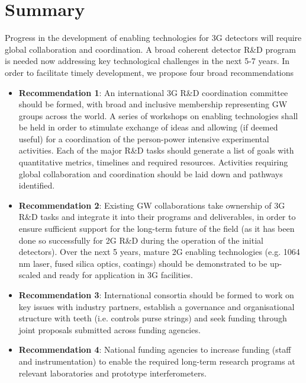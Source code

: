 \chapter{Summary}
\label{sec:Summary}
\vspace{1cm}
Progress in the development of enabling technologies for 3G detectors will require global collaboration and coordination. A broad coherent detector R\&D program is needed now addressing key technological challenges in the next 5-7 years. In order to facilitate timely development, we propose four broad recommendations

\begin{itemize}
\item \textbf{Recommendation 1}:  An international 3G R\&D coordination committee should be formed, with broad and inclusive membership representing GW groups across the world. A series of workshops on enabling technologies shall be held in order to stimulate exchange of ideas and allowing (if deemed useful) for a coordination of the person-power intensive experimental activities.  Each of the major R\&D tasks should generate a list of  goals with quantitative metrics,  timelines and required resources.   Activities requiring global collaboration and coordination should be laid down and pathways identified.
\item \textbf{Recommendation 2}: Existing GW collaborations take ownership of 3G R\&D tasks and integrate it into their programs and deliverables, in order to ensure sufficient support for the long-term future of the field (as it has been done so successfully for 2G R\&D during the operation of the initial detectors). Over the next 5 years, mature 2G enabling technologies (e.g. 1064\,nm laser, fused silica optics, coatings) should be demonstrated to be up-scaled and ready for application in 3G facilities.
\item \textbf{Recommendation 3}:  International consortia should be formed to work on key issues with industry partners, establish a governance and organisational structure with teeth (i.e. controls purse strings) and seek funding through joint proposals submitted across funding agencies.
\item \textbf{Recommendation 4}: National funding agencies to increase funding (staff and instrumentation)   to enable the required long-term research programs at relevant laboratories and prototype interferometers.
\end{itemize}
